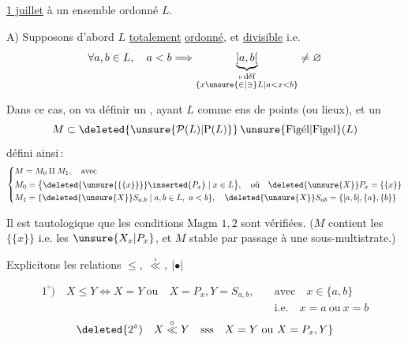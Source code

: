 \uline{1 juillet}\qquad {} à un ensemble ordonné $L$.


A) Supposons d'abord $L$ \uline{totalement} \uline{ordonné}, et \uline{divisible} i.e.
\[
 \forall a,b\in L,\quad a<b\Longrightarrow
 \underbrace{]a,b[}_{\substack{\shortparallel\,\text{déf}\\
     \{x\unsure{\in|\ni}L\mid a<x<b\}}}\ne\varnothing
\]

Dans ce cas, on va définir un  \uline{}, ayant $L$ comme ens de points (ou lieux), et un
\[
 M\subset\deleted{\unsure{\mathcal P(L)|\mathrm{P}(L)}}\,\unsure{\text{Figél}|\text{Figel}}(L)
\]
défini ainsi\,:
\[
\left\{\begin{aligned}
 &M=M_0\amalg M_1,\quad\text{avec}\\
 &M_0=\big\{\deleted{\unsure{\{\{x\}\}}}\inserted{P_x}\mid x\in L\big\},\quad
     \text{où}\quad \deleted{\unsure{X}}P_x=\{\{x\}\}\\
 &M_1=\{\deleted{\unsure{X}}S_{a,b}\mid a,b\in L,\ a<b\},\quad
     \deleted{\unsure{X}}S_{ab}=\{[a,b],\{a\},\{b\}\}
\end{aligned}\right.
\]
\margin{\uline{NB} Quand on écrit $S_{a,b}$, on sous-entend $a<b$. On a besoin de la divisibilité, pour que $S_{a,b}$ soit bien une figure, i.e. \deleted{$S_{a,b}^{\circ}=\unsure{]a,b[}$} $S_{ab}^{\circ}\overset{\text{déf}}{=}|S_{a,b}|\setminus|\partial S_{ab}|\ne\varnothing$}

Il est tautologique que les conditions $\text{Magm }1,2$ sont vérifiées. ($M$ contient les $\{\{x\}\}$ i.e. les $\unsure{X_x|P_x}$, et $M$ stable par passage à une sous-multistrate.)

Explicitons les relations $\leq,\ \overset{\circ}{\ll},\ |\bullet|$


\[
\begin{aligned}
1^\circ)\quad X\leq Y\Longleftrightarrow X=Y\ \text{ou}\quad
  X=P_x,Y=S_{a,b},\quad&\text{avec}\quad x\in\{a,b\}\\[-2pt]
 &\text{i.e.}\quad x=a\ \text{ou}\ x=b
\end{aligned}
\]
\[
\deleted{2^\circ)\quad X\overset{\circ}{\ll}Y\quad\text{sss}\quad X=Y\ \text{ou}\ X=P_x,Y}
\]

